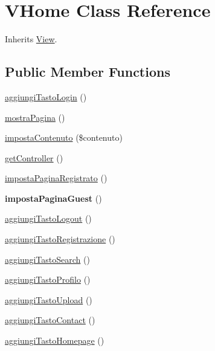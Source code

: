 \hypertarget{class_v_home}{}\section{V\+Home Class Reference}
\label{class_v_home}


Inherits \mbox{\hyperlink{class_view}{View}}.

\subsection*{Public Member Functions}
\begin{DoxyCompactItemize}
\item 
\mbox{\hyperlink{class_v_home_a3e06682fe6e21b37b754eeae97125508}{aggiungi\+Tasto\+Login}} ()
\item 
\mbox{\hyperlink{class_v_home_a72414d19f9cddd5682f160cb9b31344c}{mostra\+Pagina}} ()
\item 
\mbox{\hyperlink{class_v_home_a56c889c43b21fb05449872dfcd614a85}{imposta\+Contenuto}} (\$contenuto)
\item 
\mbox{\hyperlink{class_v_home_a6997728b15232ea9c0ed4c142634bcf8}{get\+Controller}} ()
\item 
\mbox{\hyperlink{class_v_home_ace9a51c09e9346c6e508d5f67c8ba6d0}{imposta\+Pagina\+Registrato}} ()
\item 
\mbox{\label{class_v_home_a8c9dfca5dd4c71702668e5d4f2a44d03}} 
{\bfseries imposta\+Pagina\+Guest} ()
\item 
\mbox{\hyperlink{class_v_home_a4623e9c0d8aef960ba5bb9c61bfe97da}{aggiungi\+Tasto\+Logout}} ()
\item 
\mbox{\hyperlink{class_v_home_a05532f14a1f2d0d974c1dc10d7a20754}{aggiungi\+Tasto\+Registrazione}} ()
\item 
\mbox{\hyperlink{class_v_home_a4ca8c85ed6df3d7b40594e257b5cd50c}{aggiungi\+Tasto\+Search}} ()
\item 
\mbox{\hyperlink{class_v_home_afe8dd3a6b2fc94f88bc08424f35c678e}{aggiungi\+Tasto\+Profilo}} ()
\item 
\mbox{\hyperlink{class_v_home_a94c49a2241c8767f71eb0e20a2ab9c4b}{aggiungi\+Tasto\+Upload}} ()
\item 
\mbox{\hyperlink{class_v_home_ac9fd5bec876ca9999718b2d2ba140d21}{aggiungi\+Tasto\+Contact}} ()
\item 
\mbox{\hyperlink{class_v_home_a3a1dff61eae360811ce56990ab8de7ea}{aggiungi\+Tasto\+Homepage}} ()
\end{DoxyCompactItemize}
